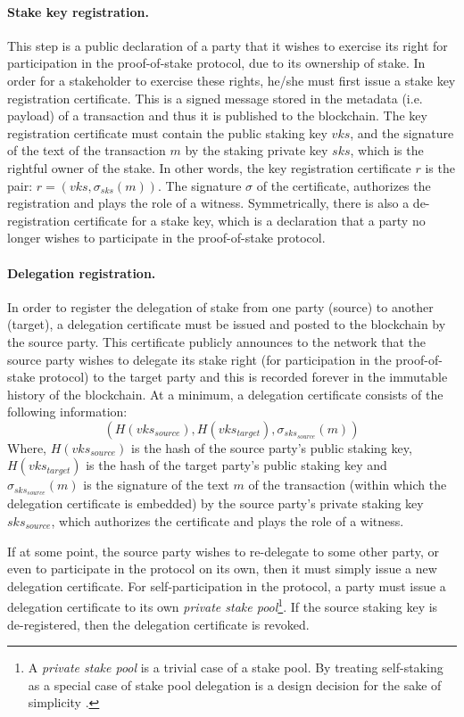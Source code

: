 \documentclass[11pt,a4paper]{article}
\begin{document}
\paragraph{Stake key registration.}
This step is a public declaration of a party that it wishes to exercise its
right for participation in the proof-of-stake protocol, due to its ownership of
stake. In order for a stakeholder to exercise these rights, he/she must first
issue a stake key registration certificate. This is a signed message stored in
the metadata (i.e. payload) of a transaction and thus it is published to the
blockchain. The key registration certificate must contain the public staking key
$vks$, and the signature of the text of the transaction $m$ by the staking
private key $sks$, which is the rightful owner of the stake. In other words, the
key registration certificate $r$ is the pair: $r = (vks, \sigma_{sks}(m))$. The
signature $\sigma$ of the certificate, authorizes the registration and plays the
role of a witness.
%
Symmetrically, there is also a de-registration certificate for a stake key,
which is a declaration that a party no longer wishes to participate in the
proof-of-stake protocol.

\paragraph{Delegation registration.}
In order to register the delegation of stake from one party (source) to another
(target), a delegation certificate must be issued and posted to the blockchain
by the source party. This certificate publicly announces to the network that the
source party wishes to delegate its stake right (for participation in the
proof-of-stake protocol) to the target party and this is recorded forever in the
immutable history of the blockchain. At a minimum, a delegation certificate
consists of the following information:
$$
(H(vks_{source}), H(vks_{target}), \sigma_{sks_{source}}(m))
$$
Where, $H(vks_{source})$ is the hash of the source party's public staking key,
$H(vks_{target})$ is the hash of the target party's public staking key and
$\sigma_{sks_{source}}(m)$ is the signature of the text $m$ of the transaction
(within which the delegation certificate is embedded) by the source party's
private staking key $sks_{source}$, which authorizes the certificate and plays
the role of a witness.

If at some point, the source party wishes to re-delegate to some other party, or
even to participate in the protocol on its own, then it must simply issue a new
delegation certificate. For self-participation in the protocol, a party must
issue a delegation certificate to its own \emph{private stake pool}\footnote{A
  \emph{private stake pool} is a trivial case of a stake pool. By treating
  self-staking as a special case of stake pool delegation is a design decision
  for the sake of simplicity \cite{deldesign}.}. If the source staking key is
de-registered, then the delegation certificate is revoked.
\end{document}
